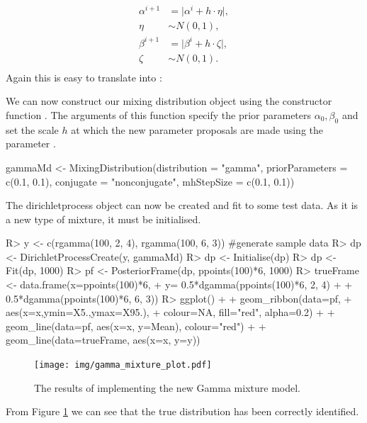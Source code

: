 \documentclass[nojss]{jss}
\begin{document}
\begin{align*}
\alpha ^{i+1} & = \lvert \alpha ^{i} + h \cdot \eta \lvert ,\\
\eta & \sim N(0, 1), \\
\beta ^{i+1} & = \lvert \beta ^{i} + h \cdot \zeta \lvert, \\
\zeta & \sim N(0, 1). \\
\end{align*}
Again this  is easy to translate into :

We can now construct our mixing distribution object using the constructor function . The arguments of this function specify the prior parameters $\alpha _0, \beta _0$ and set the scale $h$ at which the new parameter proposals are made using the parameter .
\begin{CodeInput}
gammaMd <- MixingDistribution(distribution = "gamma",
                              priorParameters = c(0.1, 0.1),
                              conjugate = "nonconjugate",
                              mhStepSize = c(0.1, 0.1))
\end{CodeInput}

The dirichletprocess object can now be created and fit to some test data. As it is a new type of mixture, it must be initialised.
\begin{Schunk}
\begin{Sinput}
R> y <- c(rgamma(100, 2, 4), rgamma(100, 6, 3)) #generate sample data
R> dp <- DirichletProcessCreate(y, gammaMd)
R> dp <- Initialise(dp)
R> dp <- Fit(dp, 1000)
R> pf <- PosteriorFrame(dp, ppoints(100)*6, 1000)
R> trueFrame <- data.frame(x=ppoints(100)*6,
+                            y= 0.5*dgamma(ppoints(100)*6, 2, 4) +
+                            0.5*dgamma(ppoints(100)*6, 6, 3))
R> ggplot() +
+    geom_ribbon(data=pf,
+                aes(x=x,ymin=X5.,ymax=X95.),
+                colour=NA, fill="red", alpha=0.2) +
+    geom_line(data=pf, aes(x=x, y=Mean), colour="red") +
+    geom_line(data=trueFrame, aes(x=x, y=y))
\end{Sinput}
\end{Schunk}
\begin{figure}[tb]
\centering
	\texttt{[image: img/gamma\_mixture\_plot.pdf]}
\caption{The results of implementing the new Gamma mixture model.}
\label{fig:gammamixture}
\end{figure}
From Figure \ref{fig:gammamixture} we can see that the true distribution has been correctly identified.
\end{document}
